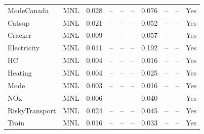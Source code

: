 {\begin{longtable}{@{}llrrrrrrrl@{}}
ModeCanada & MNL & 0.028 & -- & -- & -- & 0.076 & -- & -- & Yes \\
Catsup & MNL & 0.021 & -- & -- & -- & 0.052 & -- & -- & Yes \\
Cracker & MNL & 0.009 & -- & -- & -- & 0.057 & -- & -- & Yes \\
Electricity & MNL & 0.011 & -- & -- & -- & 0.192 & -- & -- & Yes \\
HC & MNL & 0.004 & -- & -- & -- & 0.016 & -- & -- & Yes \\
Heating & MNL & 0.004 & -- & -- & -- & 0.025 & -- & -- & Yes \\
Mode & MNL & 0.003 & -- & -- & -- & 0.016 & -- & -- & Yes \\
NOx & MNL & 0.006 & -- & -- & -- & 0.040 & -- & -- & Yes \\
RiskyTransport & MNL & 0.024 & -- & -- & -- & 0.045 & -- & -- & Yes \\
Train & MNL & 0.016 & -- & -- & -- & 0.033 & -- & -- & Yes \\
\end{longtable}
}
